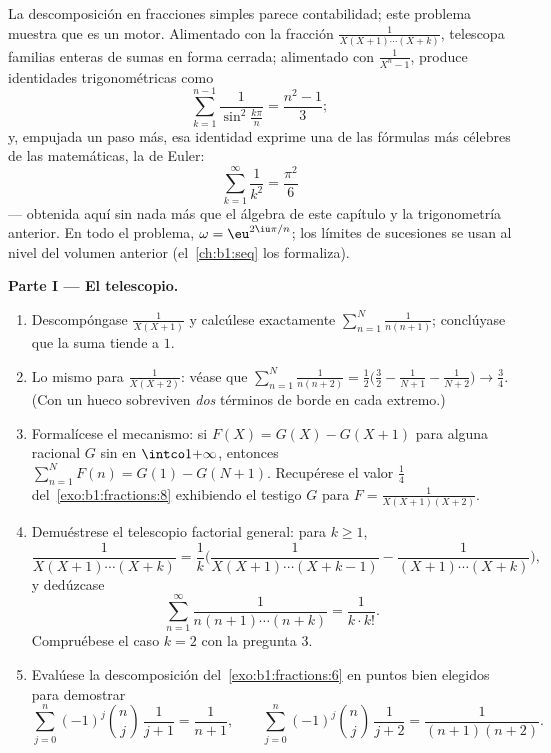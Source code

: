 \begin{problem}\label{pb:b1:fractions:1}
La descomposición en fracciones simples parece contabilidad; este
problema muestra que es un motor. Alimentado con la fracción
$\frac1{X(X+1)\cdots(X+k)}$, telescopa familias enteras de sumas en
forma cerrada; alimentado con $\frac1{X^n - 1}$, produce identidades
trigonométricas como
\[
\sum_{k=1}^{n-1}\frac{1}{\sin^2\frac{k\pi}{n}} = \frac{n^2-1}{3} ;
\]
y, empujada un paso más, esa identidad exprime una de las fórmulas más
célebres de las matemáticas, la de Euler:
\[
\sum_{k=1}^{\infty}\frac1{k^2} = \frac{\pi^2}{6}
\]
--- obtenida aquí sin nada más que el álgebra de este capítulo y la
trigonometría anterior.
En todo el problema, $\omega = \eu^{2\iu\pi/n}$; los límites de
sucesiones se usan al nivel del volumen anterior (el~\cref{ch:b1:seq}
los formaliza).

\medskip
\noindent\textbf{Parte I --- El telescopio.}
\begin{enumerate}
  \item Descompóngase $\frac1{X(X+1)}$ y calcúlese exactamente
        $\sum_{n=1}^{N} \frac1{n(n+1)}$; conclúyase que la suma tiende
        a $1$.
  \item Lo mismo para $\frac1{X(X+2)}$: véase que
        $\sum_{n=1}^{N} \frac1{n(n+2)} = \frac12\bigl(\frac32 -
        \frac1{N+1} - \frac1{N+2}\bigr) \to \frac34$. (Con un hueco
        sobreviven \emph{dos} términos de borde en cada extremo.)
  \item Formalícese el mecanismo: si $F(X) = G(X) - G(X+1)$ para alguna
        racional $G$ sin  en $\intco1{+\infty}$, entonces
        $\sum_{n=1}^N F(n) = G(1) - G(N+1)$. Recupérese el valor
        $\frac14$ del~\cref{exo:b1:fractions:8} exhibiendo el testigo
        $G$ para $F = \frac1{X(X+1)(X+2)}$.
  \item Demuéstrese el telescopio factorial general: para $k \geq 1$,
        \[
        \frac{1}{X(X+1)\cdots(X+k)}
        = \frac1k\biggl(\frac{1}{X(X+1)\cdots(X+k-1)}
        - \frac{1}{(X+1)\cdots(X+k)}\biggr),
        \]
        y dedúzcase
        \[
        \sum_{n=1}^{\infty}\frac{1}{n(n+1)\cdots(n+k)}
        = \frac{1}{k \cdot k!} .
        \]
        Compruébese el caso $k = 2$ con la pregunta 3.
  \item Evalúese la descomposición del~\cref{exo:b1:fractions:6} en
        puntos bien elegidos para demostrar
        \[
        \sum_{j=0}^{n}(-1)^j\binom nj\,\frac1{j+1}
        = \frac1{n+1},
        \qquad
        \sum_{j=0}^{n}(-1)^j\binom nj\,\frac1{j+2}
        = \frac1{(n+1)(n+2)} .
        \]
\end{enumerate}


\end{problem}
